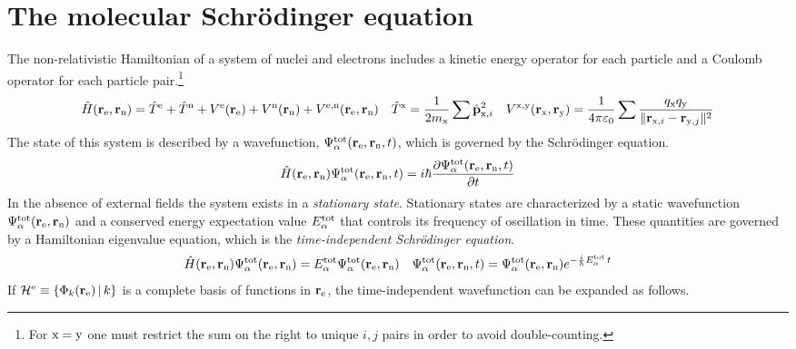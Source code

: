 \documentclass[11pt]{article}
\begin{document}
\setlength{\abovedisplayskip}{5pt}
\setlength{\belowdisplayskip}{5pt}


\section*{The molecular Schr\"odinger equation}

\begin{rmk}
The non-relativistic Hamiltonian of a system of nuclei and electrons includes a kinetic energy operator for each particle and a Coulomb operator for each particle pair.\footnote{
  For $\mathrm{x}=\mathrm{y}$ one must restrict the sum on the right to unique $i,j$ pairs in order to avoid double-counting.}
\begin{align}
  \op{H}(\bo{r}_\mr{e},\bo{r}_\mr{n})
=
  \op{T}^\mr{e}
+
  \op{T}^\mr{n}
+
  V^\mr{e}(\bo{r}_\mr{e})
+
  V^\mr{n}(\bo{r}_\mr{n})
+
  V^{\mr{e},\mr{n}}(\bo{r}_\mr{e},\bo{r}_\mr{n})
&&
  \op{T}^\mr{x}
=
  \fr{1}{2m_\mr{x}}
  \sum
  \op{\bo{p}}_{\mr{x},i}^2
&&
  V^{\mr{x},\mr{y}}(\bo{r}_\mr{x},\bo{r}_\mr{y})
=
  \fr{1}{4\pi \e_0}
  \sum
  \fr{
    q_\mr{x}q_\mr{y}
  }{
    \|\bo{r}_{\mr{x},i} - \bo{r}_{\mr{y},j}\|^2
  }
\end{align}
The state of this system is described by a wavefunction,
$\Psi _{\alpha }^{\mathrm{tot}}(\mathbf{r}_{\mathrm{e}},\mathbf{r}_{\mathrm{n}}, t)$, which is governed by the Schr\"odinger equation.
\begin{align}
  \hat{H}(\mathbf{r}_{\mathrm{e}},\mathbf{r}_{\mathrm{n}})
  \Psi _{\alpha }^{\mathrm{tot}}(\mathbf{r}_{\mathrm{e}},\mathbf{r}_{\mathrm{n}}, t)
=
  i
  \hbar
  \frac {\partial
    \Psi _{\alpha }^{\mathrm{tot}}(\mathbf{r}_{\mathrm{e}},\mathbf{r}_{\mathrm{n}}, t)
  }{\partial
    t
  }
\end{align}
In the absence of external fields the system exists in a \textit{stationary state}.
Stationary states are characterized by a static wavefunction $\Psi _{\alpha }^{\mathrm{tot}}(\mathbf{r}_{\mathrm{e}},\mathbf{r}_{\mathrm{n}})$ and a conserved energy expectation value $E_{\alpha }^{\mathrm{tot}}$ that controls its frequency of oscillation in time.
These quantities are governed by a Hamiltonian eigenvalue equation, which is the \textit{time-independent Schr\"odinger equation}.
\begin{align}
\label{eq:molecular-schrodinger-equation}
  \hat{H}(\mathbf{r}_{\mathrm{e}},\mathbf{r}_{\mathrm{n}})
  \Psi _{\alpha }^{\mathrm{tot}}(\mathbf{r}_{\mathrm{e}},\mathbf{r}_{\mathrm{n}})
=
  E_{\alpha }^{\mathrm{tot}}
  \Psi _{\alpha }^{\mathrm{tot}}(\mathbf{r}_{\mathrm{e}},\mathbf{r}_{\mathrm{n}})
&&
  \Psi _{\alpha }^{\mathrm{tot}}(\mathbf{r}_{\mathrm{e}},\mathbf{r}_{\mathrm{n}}, t)
=
  \Psi _{\alpha }^{\mathrm{tot}}(\mathbf{r}_{\mathrm{e}},\mathbf{r}_{\mathrm{n}})
  e^{-\frac {i}{\hbar}E_{\alpha }^{\mathrm{tot}}\,t}
\end{align}
If $\mathcal{H}^{\mathrm{e}}\equiv\{\Phi _k(\mathbf{r}_{\mathrm{e}})\,|\,k\}$ is a complete basis of functions in $\mathbf{r}_{\mathrm{e}}$, the time-independent wavefunction can be expanded as follows.

\end{rmk}
\end{document}
